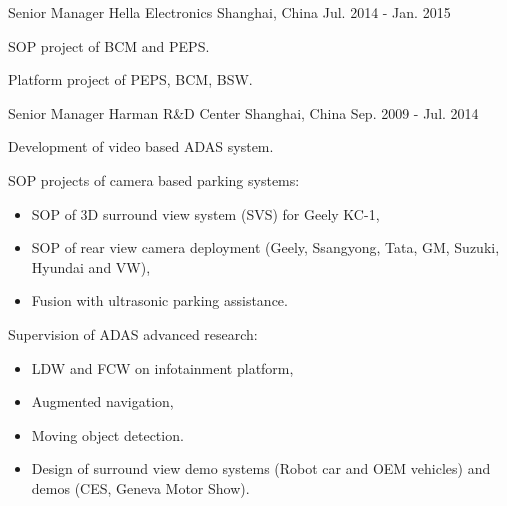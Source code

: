 \documentclass[../cv_xin.tex]{subfiles}
\begin{document}
\begin{cventries}
  \cventry
    {Senior Manager} %
    {Hella Electronics} %
    {Shanghai, China} %
    {Jul. 2014 - Jan. 2015} %
    {
      \begin{cvitems}
        \item SOP project of BCM and PEPS.
        \item Platform project of PEPS, BCM, BSW.
      \end{cvitems}
    }

  \cventry
    {Senior Manager} %
    {Harman R\&D Center} %
    {Shanghai, China} %
    {Sep. 2009 - Jul. 2014} %
    {
      \begin{cvitems}
        \item Development of video based ADAS system.
        \item SOP projects of camera based parking systems:
          \begin{itemize}
            \item SOP of 3D surround view system (SVS) for Geely KC-1,
            \item SOP of rear view camera deployment (Geely, Ssangyong, Tata, GM, Suzuki, Hyundai and VW),
            \item Fusion with ultrasonic parking assistance.
           \end{itemize}
        \item Supervision of ADAS advanced research:
          \begin{itemize}
            \item LDW and FCW on infotainment platform,
            \item Augmented navigation,
            \item Moving object detection.
            \item Design of surround view demo systems (Robot car and OEM vehicles) and demos (CES, Geneva Motor Show).
          \end{itemize}
      \end{cvitems}
    }
\end{cventries}
\end{document}
